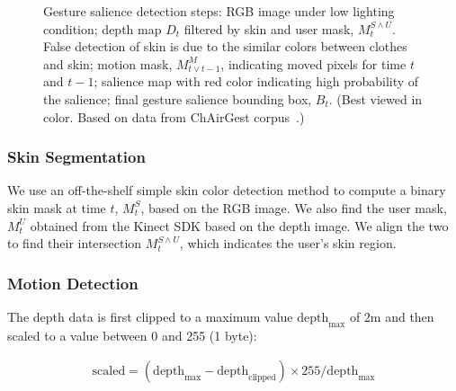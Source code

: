 \begin{figure}[tb]
{}
\caption{Gesture salience detection steps:  RGB image under low lighting condition;
 depth map $D_t$ filtered by skin and user mask, $M_t^{S\wedge U}$. False detection of skin is due to
the similar colors between clothes and skin;  motion mask,  $M_{t\vee t-1}^M$, indicating moved pixels for time $t$ and $t-1$;
 salience map with red color indicating high probability of the salience;
 final gesture salience bounding box, $B_t$. (Best viewed in
color. Based on data from ChAirGest corpus~\cite{Ruffieux2013}.)}
\label{fig:gesture-salience}
\end{figure}

\subsubsection{Skin Segmentation}
We use an off-the-shelf simple skin color detection method to compute a binary skin mask at
time $t$, $M_t^S$, based on the RGB image. We also find the user mask, $M_t^U$ obtained from the Kinect SDK based on the depth image.
We align the two to find their intersection $M_t^{S\wedge U}$, which indicates the user's skin region.

\subsubsection{Motion Detection}
The depth data is first clipped to a maximum value $\text{depth}_\text{max}$ of
2m and then scaled to a value between 0 and 255 (1 byte):

\begin{align*}
\text{scaled} = (\text{depth}_\text{max} -
\text{depth}_\text{clipped}) \times 255 / \text{depth}_\text{max}
\end{align*}

